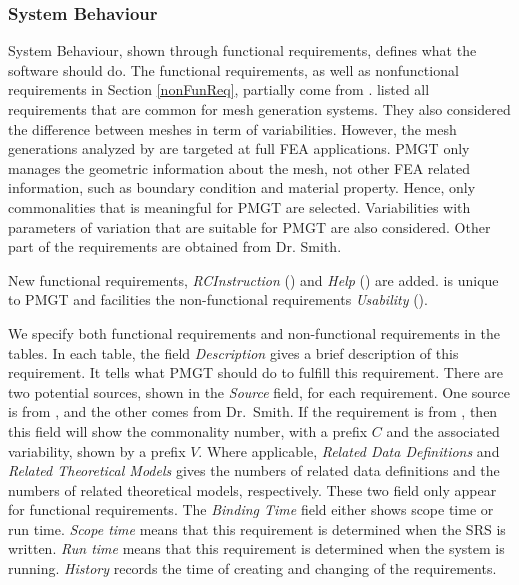 \documentclass[12pt,titlepage]{article}
\begin{document}
\subsubsection{System Behaviour}
System Behaviour, shown through functional requirements, defines what the software should do. The functional requirements, as well as nonfunctional requirements in Section \ref{nonFunReq}, partially come from \citet{Smith2004}. \citet{Smith2004} listed all requirements that are common for mesh generation systems. They also considered the difference between meshes in term of variabilities. However, the mesh generations analyzed by \citet{Smith2004} are targeted at full FEA applications. PMGT only manages the geometric information about the mesh, not other FEA related information, such as boundary condition and material property. Hence, only commonalities that is meaningful for PMGT are selected. Variabilities with parameters of variation that are suitable for PMGT are also considered. Other part of the requirements are obtained from Dr. Smith.

New functional requirements, \emph{RCInstruction} () and \emph{Help} () are added.  is unique to PMGT and  facilities the non-functional requirements \emph{Usability} ().

We specify both functional requirements and non-functional requirements in the tables. In each table, the field \emph{Description} gives a brief description of this requirement. It tells what PMGT should do to fulfill this requirement. There are two potential sources, shown in the \emph{Source} field, for each requirement. One source is from \citet{Smith2004}, and the other comes from Dr.~Smith. If the requirement is from \citet{Smith2004}, then this field will show the commonality number, with a prefix $C$ and the associated variability, shown by a prefix $V$. Where applicable, \emph{Related Data Definitions} and \emph{Related Theoretical Models} gives the numbers of related data definitions and the numbers of related theoretical models, respectively. These two field only appear for functional requirements. The \emph{Binding Time} field either shows scope time or run time. \emph{Scope time} means that this requirement is determined when the SRS is written. \emph{Run time} means that this requirement is determined when the system is running. \emph{History} records the time of creating and changing of the requirements. 
\end{document}
